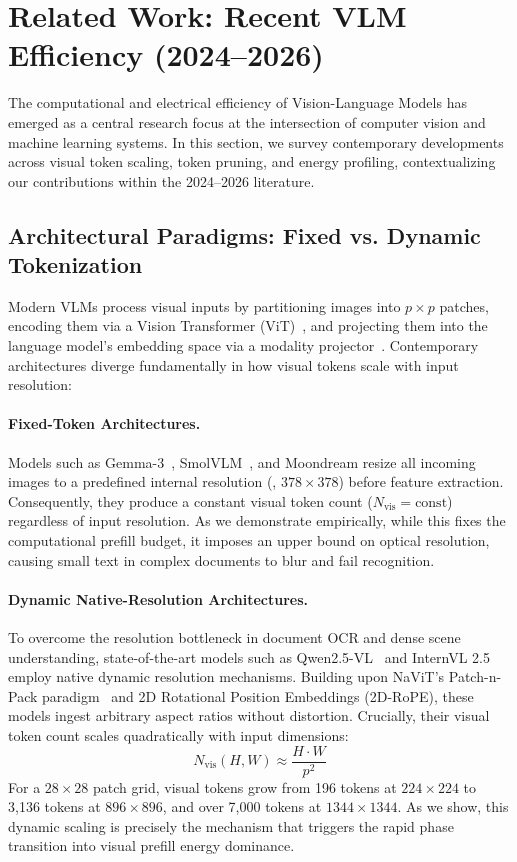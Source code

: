 \section{Related Work: Recent VLM Efficiency (2024--2026)}
\label{sec:related_work}

The computational and electrical efficiency of Vision-Language Models has emerged as a central research focus at the intersection of computer vision and machine learning systems. In this section, we survey contemporary developments across visual token scaling, token pruning, and energy profiling, contextualizing our contributions within the 2024--2026 literature.

\subsection{Architectural Paradigms: Fixed vs. Dynamic Tokenization}
Modern VLMs process visual inputs by partitioning images into $p \times p$ patches, encoding them via a Vision Transformer (ViT)~\cite{dosovitskiy2020image}, and projecting them into the language model's embedding space via a modality projector~\cite{liu2023visual}. Contemporary architectures diverge fundamentally in how visual tokens scale with input resolution:

\paragraph{Fixed-Token Architectures.}
Models such as Gemma-3~\cite{gemma3_2025}, SmolVLM~\cite{smolvlm2025}, and Moondream resize all incoming images to a predefined internal resolution (\eg, $378 \times 378$) before feature extraction. Consequently, they produce a constant visual token count ($N_{\text{vis}} = \text{const}$) regardless of input resolution. As we demonstrate empirically, while this fixes the computational prefill budget, it imposes an upper bound on optical resolution, causing small text in complex documents to blur and fail recognition.

\paragraph{Dynamic Native-Resolution Architectures.}
To overcome the resolution bottleneck in document OCR and dense scene understanding, state-of-the-art models such as Qwen2.5-VL~\cite{qwen2_5_vl_2025} and InternVL 2.5~\cite{chen2024internvl} employ native dynamic resolution mechanisms. Building upon NaViT's Patch-n-Pack paradigm~\cite{dehghani2023patch} and 2D Rotational Position Embeddings (2D-RoPE), these models ingest arbitrary aspect ratios without distortion. Crucially, their visual token count scales quadratically with input dimensions:
\begin{equation}
    N_{\text{vis}}(H, W) \approx \frac{H \cdot W}{p^2}
\end{equation}
For a $28 \times 28$ patch grid, visual tokens grow from 196 tokens at $224 \times 224$ to 3,136 tokens at $896 \times 896$, and over 7,000 tokens at $1344 \times 1344$. As we show, this dynamic scaling is precisely the mechanism that triggers the rapid phase transition into visual prefill energy dominance.

